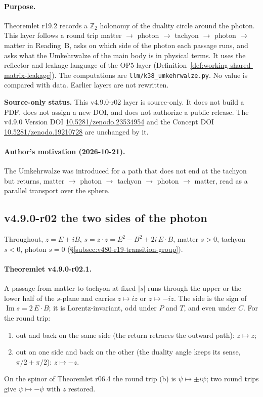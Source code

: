 \paragraph{Purpose.}
Theoremlet r19.2 records a \(\mathbb Z_2\) holonomy of the duality circle around the photon.  This layer follows a round
trip matter \(\to\) photon \(\to\) tachyon \(\to\) photon \(\to\) matter in Reading~B, asks on which side of the photon each
passage runs, and asks what the Umkehrwalze of the main body is in physical terms.  It uses the reflector and leakage
language of the OP5 layer (Definition~\ref{def:working-shared-matrix-leakage}).  The computations are
\texttt{llm/k38\_umkehrwalze.py}.  No value is compared with data.  Earlier layers are not rewritten.

\noindent\textbf{Source-only status.}
This v4.9.0-r02 layer is source-only.  It does not build a PDF, does not assign a new DOI,
and does not authorize a public release.  The v4.9.0 Version DOI
\href{https://doi.org/10.5281/zenodo.23534954}{10.5281/zenodo.23534954} and the Concept DOI
\href{https://doi.org/10.5281/zenodo.19210728}{10.5281/zenodo.19210728} are unchanged by it.

\paragraph{Author's motivation (2026-10-21).}
The Umkehrwalze was introduced for a path that does not end at the tachyon but returns, matter \(\to\) photon \(\to\)
tachyon \(\to\) photon \(\to\) matter, read as a parallel transport over the sphere.

\subsection*{v4.9.0-r02 the two sides of the photon}
\label{subsec:v490-r02-sides}

Throughout, \(z=E+iB\), \(s=z\cdot z=E^2-B^2+2i\,E\cdot B\), matter \(s>0\), tachyon \(s<0\), photon \(s=0\)
(\S\ref{subsec:v480-r19-transition-group}).

\paragraph{Theoremlet v4.9.0-r02.1.}
A passage from matter to tachyon at fixed \(|s|\) runs through the upper or the lower half of the \(s\)-plane and carries
\(z\mapsto iz\) or \(z\mapsto -iz\).  The side is the sign of \(\operatorname{Im}s=2\,E\cdot B\); it is Lorentz-invariant,
odd under \(P\) and \(T\), and even under \(C\).  For the round trip:
\begin{enumerate}[leftmargin=2em]
\item[(a)] out and back on the same side (the return retraces the outward path): \(z\mapsto z\);
\item[(b)] out on one side and back on the other (the duality angle keeps its sense, \(\pi/2+\pi/2\)): \(z\mapsto -z\).
\end{enumerate}
On the spinor of Theoremlet r06.4 the round trip (b) is \(\psi\mapsto\pm i\psi\); two round trips give
\(\psi\mapsto-\psi\) with \(z\) restored.

